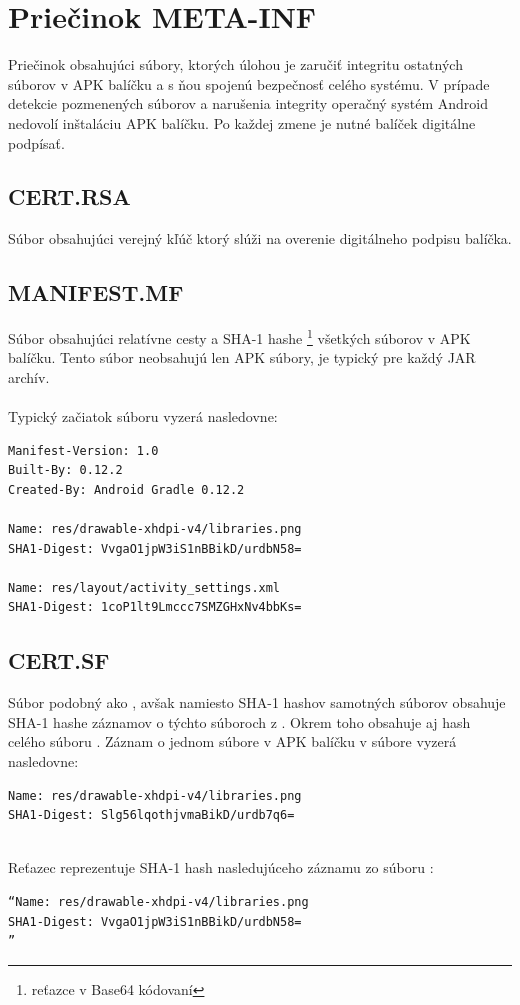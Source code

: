 \section{Priečinok META-INF}
\label{META-INF}
Priečinok obsahujúci súbory, ktorých úlohou je zaručiť integritu ostatných súborov v APK balíčku a s ňou spojenú bezpečnosť celého systému. V prípade detekcie pozmenených súborov a narušenia integrity operačný systém Android nedovolí inštaláciu APK balíčku. Po každej zmene je nutné balíček digitálne podpísať.


\subsection*{CERT.RSA}
\label{CERT.RSA} 
Súbor obsahujúci verejný kľúč ktorý slúži na overenie digitálneho podpisu balíčka.
\subsection*{MANIFEST.MF}
\label{MANIFEST.MF}
Súbor obsahujúci relatívne cesty a SHA-1 hashe \footnote{reťazce v Base64 kódovaní} všetkých súborov v APK balíčku. Tento súbor neobsahujú len APK súbory, je typický pre každý JAR archív.\\\\
Typický začiatok súboru  vyzerá nasledovne: \\

\begin{verbatim}
Manifest-Version: 1.0
Built-By: 0.12.2
Created-By: Android Gradle 0.12.2

Name: res/drawable-xhdpi-v4/libraries.png
SHA1-Digest: VvgaO1jpW3iS1nBBikD/urdbN58=

Name: res/layout/activity_settings.xml
SHA1-Digest: 1coP1lt9Lmccc7SMZGHxNv4bbKs=
\end{verbatim}

\subsection*{CERT.SF}
\label{CERT.SF}
Súbor podobný ako , avšak namiesto SHA-1 hashov samotných súborov obsahuje SHA-1 hashe záznamov o týchto súboroch z . Okrem toho obsahuje aj hash celého súboru . \newline Záznam o jednom súbore v APK balíčku v súbore  vyzerá nasledovne: \newline
\begin{verbatim}
Name: res/drawable-xhdpi-v4/libraries.png
SHA1-Digest: Slg56lqothjvmaBikD/urdb7q6=
\end{verbatim}\mbox{}\\
Reťazec  reprezentuje SHA-1 hash nasledujúceho záznamu zo súboru :\mbox{}\\
\begin{verbatim}
“Name: res/drawable-xhdpi-v4/libraries.png
SHA1-Digest: VvgaO1jpW3iS1nBBikD/urdbN58=
”\end{verbatim}

